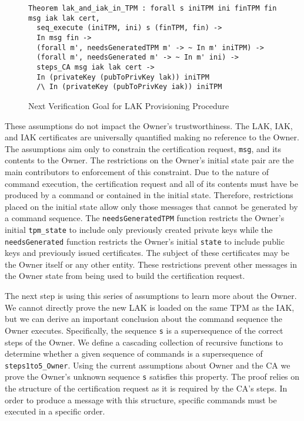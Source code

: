 \documentclass[runningheads]{llncs}
\begin{document}
\begin{figure}[hbtp]
\begin{lstlisting}[language=Coq]
Theorem lak_and_iak_in_TPM : forall s iniTPM ini finTPM fin msg iak lak cert,
  seq_execute (iniTPM, ini) s (finTPM, fin) -> 
  In msg fin ->
  (forall m', needsGeneratedTPM m' -> ~ In m' iniTPM) ->
  (forall m', needsGenerated m' -> ~ In m' ini) ->
  steps_CA msg iak lak cert ->
  In (privateKey (pubToPrivKey lak)) iniTPM
  /\ In (privateKey (pubToPrivKey iak)) iniTPM
\end{lstlisting}
\caption{Next Verification Goal for LAK Provisioning Procedure}
\label{fig:lak_goal}
\end{figure}

These assumptions do not impact the Owner's trustworthiness. The LAK,
IAK, and IAK certificates are universally quantified making no
reference to the Owner. The assumptions aim only to constrain the
certification request, \verb|msg|, and its contents to the Owner.  The
restrictions on the Owner's initial state pair are the main
contributors to enforcement of this constraint. Due to the nature of
command execution, the certification request and all of its contents
must have be produced by a command or contained in the initial state.
Therefore, restrictions placed on the initial state allow only those
messages that cannot be generated by a command sequence.  The
\verb|needsGeneratedTPM| function restricts the Owner's initial
\verb|tpm_state| to include only previously created private keys while
the \verb|needsGenerated| function restricts the Owner's initial
\verb|state| to include public keys and previously issued
certificates.  The subject of these certificates may be the Owner
itself or any other entity.  These restrictions prevent other messages
in the Owner state from being used to build the certification request.

The next step is using this series of assumptions to learn more about
the Owner. We cannot directly prove the new LAK is loaded on the same
TPM as the IAK, but we can derive an important conclusion about the
command sequence the Owner executes. Specifically, the sequence
\verb|s| is a supersequence of the correct steps of the Owner.  We
define a cascading collection of recursive functions to determine
whether a given sequence of commands is a supersequence of
\verb|steps1to5_Owner|.  Using the current assumptions about Owner and
the CA we prove the Owner's unknown sequence \verb|s| satisfies
this property. The proof relies on the structure of the
certification request as it is required by the CA's steps. In order to
produce a message with this structure, specific commands must be
executed in a specific order.
\end{document}
